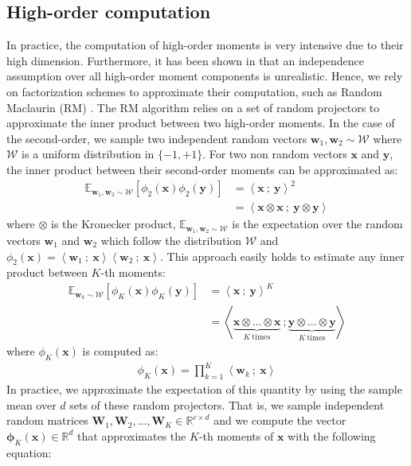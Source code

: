 \documentclass[10pt,twocolumn,letterpaper]{article}
\def\vw{{\bm{w}}}
\def\vx{{\bm{x}}}
\def\vy{{\bm{y}}}
\def\mW{{\bm{W}}}
\def\sR{{\mathbb{R}}}
\newcommand{\E}{\mathbb{E}}
\begin{document}
    \subsection{High-order computation}\label{sec:met_implementation}
        In practice, the computation of high-order moments is very intensive due to their high dimension.
        Furthermore, it has been shown in \cite{Jegou_2012_ECCV, Opitz_2017_ICCV} that an independence assumption over all high-order moment components is unrealistic.
        Hence, we rely on factorization schemes to approximate their computation, such as Random Maclaurin (RM) \cite{Kar_PMLR_2012}.
        The RM algorithm relies on a set of random projectors to approximate the inner product between two high-order moments.
        In the case of the second-order, we sample two independent random vectors $\vw_1, \vw_2 \sim \mathcal{W}$ where $\mathcal{W}$ is a uniform distribution in $\{-1, +1\}$.
        For two non random vectors $\vx$ and $\vy$, the inner product between their second-order moments can be approximated as:
        \begin{align}
            \nonumber \E_{\vw_1, \vw_2 \sim \mathcal{W}}[\phi_2(\vx) \phi_2(\vy)] &= \left<\vx \ ; \ \vy \right>^2 \\
            &= \left<\vx \otimes \vx \ ; \ \vy \otimes \vy \right> 
        \end{align}
        where $\otimes$ is the Kronecker product, $\E_{\vw_1, \vw_2 \sim \mathcal{W}}$ is the expectation over the random vectors $\vw_1$ and $\vw_2$ which follow the distribution $\mathcal{W}$ and $\phi_2(\vx) = \left<\vw_1 \ ; \ \vx \right>\left<\vw_2 \ ; \ \vx \right>$.
        This approach easily holds to estimate any inner product between $K$-th moments:
        \begin{align}
            \nonumber \E_{\vw_{k} \sim \mathcal{W}}[\phi_K(\vx) \phi_K(\vy)] &= \left<\vx \ ; \ \vy \right>^K \\
            &= \left<\underbrace{\vx \otimes \dots \otimes \vx}_{K \ \text{times}}\ ; \underbrace{\vy \otimes \dots \otimes \vy}_{K \ \text{times}} \right> 
        \end{align}
        where $\phi_K(\vx)$ is computed as:
        \begin{align}
            \phi_K(\vx) = \prod_{k=1}^K \left<\vw_k \ ; \ \vx \right>
        \end{align}
        In practice, we approximate the expectation of this quantity by using the sample mean over $d$ sets of these random projectors.
        That is, we sample independent random matrices $\mW_1, \mW_2, ..., \mW_K \in \sR^{c \times d}$ and we compute the vector $\boldsymbol{\phi}_K(\vx) \in \sR^d$ that approximates the $K$-th moments of $\vx$ with the following equation:
\end{document}
